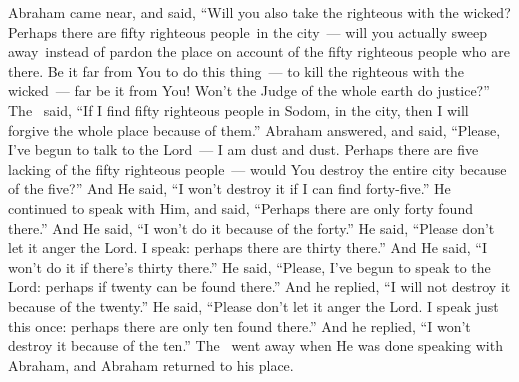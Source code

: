 \begin{inparaenum}
   Abraham came near, and said, ``Will you also take the righteous with the wicked?%
   Perhaps there are fifty righteous people\understood\ in the city~--- will you actually sweep away\understood\ instead of pardon the place on account of the fifty righteous people who are there.%
   Be it far from You to do this thing~--- to kill the righteous with the wicked~--- far be it from You! Won't the Judge of the whole earth do justice?''%
   The \lord\ said, ``If I find fifty righteous people in Sodom, in the city, then I will forgive the whole place because of them.''%
   Abraham answered, and said, ``Please, I've begun to talk to the Lord~--- I am dust and dust.%
   Perhaps there are five lacking of the fifty righteous people~--- would You destroy the entire city because of the five?'' And He said, ``I won't destroy it if I can find forty-five.''%
   He continued to speak with Him, and said, ``Perhaps there are only forty found there.'' And He said, ``I won't do it because of the forty.''%
   He said, ``Please don't let it anger the Lord. I speak: perhaps there are thirty there.'' And He said, ``I won't do it if there's thirty there.''%
   He said, ``Please, I've begun to speak to the Lord: perhaps if twenty can be found there.'' And he replied, ``I will not destroy it because of the twenty.''%
   He said, ``Please don't let it anger the Lord. I speak just this once: perhaps there are only ten found there.'' And he replied, ``I won't destroy it because of the ten.''%
   The \lord\ went away when He was done speaking with Abraham, and Abraham returned to his place.%
\end{inparaenum}
